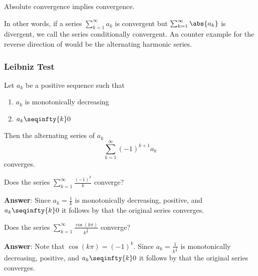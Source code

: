 \begin{thm}\label{thm-general-absolute-convergence-implies-convergence}
	Absolute convergence implies convergence.
\end{thm}

\begin{rem}\label{rem-general-absolute-convergence-implies-convergence}
	In other words, if a series $\sum_{k=1}^\infty a_k$ is convergent but
	$\sum_{k=1}^\infty \abs{a_k}$ is divergent, we call the series conditionally
	convergent. An counter example for the reverse direction of
	 would
	be the alternating harmonic series.
\end{rem}

\subsubsection{Leibniz Test}\label{subsubsec-leibniz-test}

\begin{thm}\label{thm-leibniz-test}
	Let $a_k$ be a positive sequence such that
	\begin{enumerate}
		\item $a_k$ is monotonically decreasing
		\item $a_k \seqinfty{k} 0$
	\end{enumerate}
	Then the alternating series of $a_k$
	\begin{equation*}
		\sum_{k=1}^\infty (-1)^{k+1} a_k
	\end{equation*}
	converges.
\end{thm}

\begin{exm}\label{exm-leibniz-test:1}
	Does the series $\sum_{k=1}^\infty \frac{(-1)^k}{k}$ converge?
	\begin{flushleft}
		\textbf{Answer}: Since $a_k=\tfrac{1}{k}$ is monotonically decreasing,
		positive, and $a_k \seqinfty{k} 0$ it follows by 
		that the original series converges.
	\end{flushleft}
\end{exm}

\begin{exm}\label{exm-leibniz-test:2}
	Does the series $\sum_{k=1}^\infty \frac{\cos(k\pi)}{k^\frac{2}{3}}$ converge?
	\begin{flushleft}
		\textbf{Answer}: Note that $\cos(k\pi)=(-1)^k$. Since $a_k=\tfrac{1}{k^\frac{2}{3}}$
		is monotonically decreasing, positive, and $a_k \seqinfty{k} 0$ it follows by
		 that the original series converges.
	\end{flushleft}
\end{exm}

